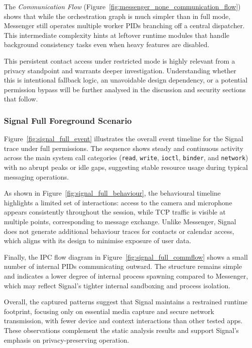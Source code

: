\documentclass[a4paper,12pt]{report}
\begin{document}
The \textit{Communication Flow} (Figure~\ref{fig:messenger_none_communication_flow}) shows that while the orchestration graph is much simpler than in full mode, Messenger still operates multiple worker PIDs branching off a central dispatcher. This intermediate complexity hints at leftover runtime modules that handle background consistency tasks even when heavy features are disabled.

This persistent contact access under restricted mode
is highly relevant from a privacy standpoint and warrants deeper investigation. Understanding whether this is intentional fallback logic, an unavoidable design dependency, or a potential permission bypass will be further analysed in the discussion and security sections that follow.
\subsubsection{Signal Full Foreground Scenario}
Figure~\ref{fig:signal_full_event} illustrates the overall event timeline for the Signal trace under full permissions. The sequence shows steady and continuous activity across the main system call categories (\texttt{read}, \texttt{write}, \texttt{ioctl}, \texttt{binder}, and \texttt{network}) with no abrupt peaks or idle gaps, suggesting stable resource usage during typical messaging operations.

As shown in Figure~\ref{fig:signal_full_behaviour}, the behavioural timeline highlights a limited set of interactions: access to the camera and microphone appears consistently throughout the session, while TCP traffic is visible at multiple points, corresponding to message exchange. Unlike Messenger, Signal does not generate additional behaviour traces for contacts or calendar access, which aligns with its design to minimise exposure of user data.

Finally, the IPC flow diagram in Figure~\ref{fig:signal_full_commflow} shows a small number of internal PIDs communicating outward. The structure remains simple and indicates a lower degree of internal process spawning compared to Messenger, which may reflect Signal’s tighter internal sandboxing and process isolation.

Overall, the captured patterns suggest that Signal maintains a restrained runtime footprint, focusing only on essential media capture and secure network transmission, with fewer device and context interactions than other tested apps. These observations complement the static analysis results and support Signal's emphasis on privacy-preserving operation.
\end{document}
